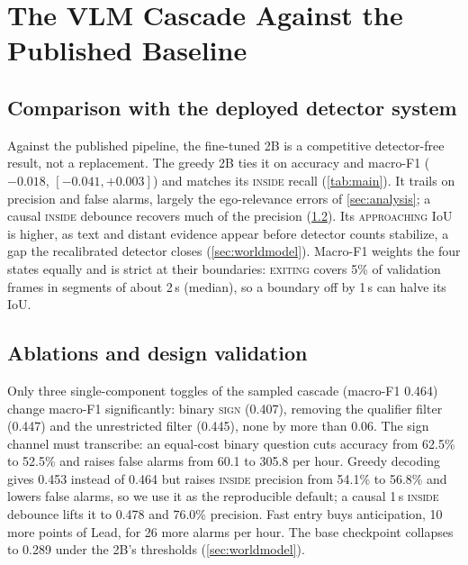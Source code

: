 \documentclass[conference]{IEEEtran}
\let\oldtextsc\textsc
\renewcommand{\textsc}[1]{\mbox{\oldtextsc{#1}}}
\begin{document}
\section{The VLM Cascade Against the Published Baseline}
\label{sec:results}

\subsection{Comparison with the deployed detector system}
\label{sec:vsdetector}



Against the published pipeline, the fine-tuned 2B is a competitive detector-free result, not a replacement.  The greedy 2B ties it on accuracy and macro-F1 ($-0.018$, $[-0.041,+0.003]$) and matches its \textsc{inside} recall (\cref{tab:main}).  It trails on precision and false alarms, largely the ego-relevance errors of \cref{sec:analysis}; a causal \textsc{inside} debounce recovers much of the precision (\cref{sec:ablations}).  Its \textsc{approaching} IoU is higher, as text and distant evidence appear before detector counts stabilize, a gap the recalibrated detector closes (\cref{sec:worldmodel}).  Macro-F1 weights the four states equally and is strict at their boundaries: \textsc{exiting} covers 5\% of validation frames in segments of about 2\,s (median), so a boundary off by 1\,s can halve its IoU.

\subsection{Ablations and design validation}
\label{sec:ablations}

Only three single-component toggles of the sampled cascade (macro-F1 0.464) change macro-F1 significantly: binary \textsc{sign} (0.407), removing the qualifier filter (0.447) and the unrestricted filter (0.445), none by more than 0.06.  The sign channel must transcribe: an equal-cost binary question cuts accuracy from 62.5\% to 52.5\% and raises false alarms from 60.1 to 305.8 per hour.  Greedy decoding gives 0.453 instead of 0.464 but raises \textsc{inside} precision from 54.1\% to 56.8\% and lowers false alarms, so we use it as the reproducible default; a causal 1\,s \textsc{inside} debounce lifts it to 0.478 and 76.0\% precision.  Fast entry buys anticipation, 10 more points of Lead, for 26 more alarms per hour.  The base checkpoint collapses to 0.289 under the 2B's thresholds (\cref{sec:worldmodel}).
\end{document}
